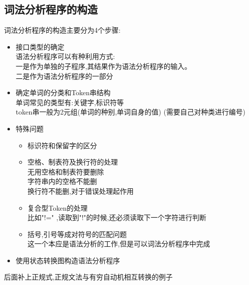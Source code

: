 \documentclass[UTF8,a4paper]{ctexart}
\begin{document}
  \subsection{词法分析程序的构造}
  词法分析程序的构造主要分为4个步骤:
  \begin{itemize}
    \item 接口类型的确定\\
    语法分析程序可以有种利用方式:\\
    一是作为单独的子程序,其结果作为语法分析程序的输入。\\
    二是作为语法分析程序的一部分
    \item 确定单词的分类和Token串结构\\
    单词常见的类型有:关键字,标识符等\\
    token串一般为2元组(单词的种别,单词自身的值)  (需要自己对种类进行编号)

    \item 特殊问题
    \begin{itemize}
      \item 标识符和保留字的区分
      \item 空格、制表符及换行符的处理\\
      无用空格和制表符要删除\\
      字符串内的空格不能删\\
      换行符不能删,对于错误处理起作用
      \item 复合型Token的处理\\
      比如"!=" ,读取到"!"的时候,还必须读取下一个字符进行判断
      \item 括号,引号等成对符号的匹配问题\\
      这一个本应是语法分析的工作,但是可以词法分析程序中完成
    \end{itemize}

    \item 使用状态转换图构造语法分析程序
  \end{itemize}

  {\color{red}后面补上正规式,正规文法与有穷自动机相互转换的例子}
\end{document}
